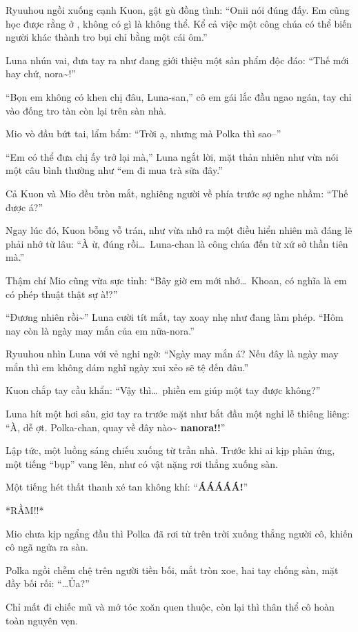 \documentclass[../main.tex]{subfiles}
\begin{document}
Ryuuhou ngồi xuống cạnh Kuon, gật gù đồng tình: ``Onii nói đúng đấy. Em cũng học được rằng ở \hll, không có gì là không thể. Kể cả việc một công chúa có thể biến người khác thành tro bụi chỉ bằng một cái ôm.''

Luna nhún vai, đưa tay ra như đang giới thiệu một sản phẩm độc đáo: ``Thế mới hay chứ, nora\~{}!''

``Bọn em không có khen chị đâu, Luna-san,'' cô em gái lắc đầu ngao ngán, tay chỉ vào đống tro tàn còn lại trên sàn nhà.

Mio vò đầu bứt tai, lẩm bẩm: ``Trời ạ, nhưng mà Polka thì sao--''

``Em có thể đưa chị ấy trở lại mà,'' Luna ngắt lời, mặt thản nhiên như vừa nói một câu bình thường như ``em đi mua trà sữa đây.''

Cả Kuon và Mio đều tròn mắt, nghiêng người về phía trước sợ nghe nhầm: ``Thế được á?''

Ngay lúc đó, Kuon bỗng vỗ trán, như vừa nhớ ra một điều hiển nhiên mà đáng lẽ phải nhớ từ lâu: ``À ừ, đúng rồi\dots\ Luna-chan là công chúa đến từ xứ sở thần tiên mà.''

Thậm chí Mio cũng vừa sực tỉnh: ``Bây giờ em mới nhớ\dots\ Khoan, có nghĩa là em có phép thuật thật sự à!?''

``Đương nhiên rồi\~{}'' Luna cười tít mắt, tay xoay nhẹ như đang làm phép. ``Hôm nay còn là ngày may mắn của em nữa-nora.''

Ryuuhou nhìn Luna với vẻ nghi ngờ: ``Ngày may mắn á? Nếu đây là ngày may mắn thì em không dám nghĩ ngày xui xẻo sẽ tệ đến đâu.''

Kuon chắp tay cầu khẩn: ``Vậy thì\dots\ phiền em giúp một tay được không?''

Luna hít một hơi sâu, giơ tay ra trước mặt như bắt đầu một nghi lễ thiêng liêng: ``À, dễ ợt. Polka-chan, quay về đây nào\~{} \textbf{nanora!!}''

Lập tức, một luồng sáng chiếu xuống từ trần nhà. Trước khi ai kịp phản ứng, một tiếng ``bụp'' vang lên, như có vật nặng rơi thẳng xuống sàn.

Một tiếng hét thất thanh xé tan không khí: ``\textbf{ÁÁÁÁÁ!}''

*RẦM!!*

Mio chưa kịp ngẩng đầu thì Polka đã rơi từ trên trời xuống thẳng người cô, khiến cô ngã ngửa ra sàn.

Polka ngồi chễm chệ trên người tiền bối, mắt tròn xoe, hai tay chống sàn, mặt đầy bối rối: ``\dots Ủa?''

Chỉ mất đi chiếc mũ và mớ tóc xoăn quen thuộc, còn lại thì thân thể cô hoàn toàn nguyên vẹn.
\end{document}
